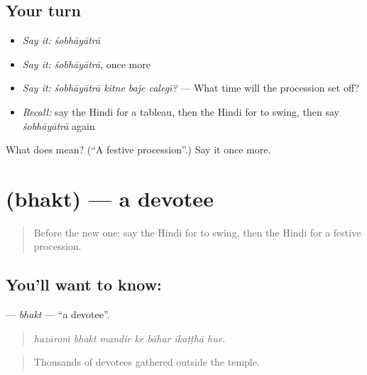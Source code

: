 \subsection*{Your turn}
\begin{itemize}
\raggedright
  \item \emph{Say it:} \emph{śobhāyātrā}
  \item \emph{Say it:} \emph{śobhāyātrā}, once more
  \item \emph{Say it:} \emph{śobhāyātrā kitne baje calegī?} — What time will the procession set off?
  \item \emph{Recall:} say the Hindi for a tableau, then the Hindi for to swing, then say \emph{śobhāyātrā} again
\end{itemize}

\begin{tcolorbox}[breakable,colback=teal!4,colframe=teal!35!black,title={Before you move on}]
What does  mean? (\textquotedblleft{}A festive procession\textquotedblright{}.) Say it once more.
\end{tcolorbox}
\section[\texorpdfstring{\hi{भक्त} (bhakt)}{भक्त (bhakt)}]{ (bhakt) — a devotee}

\label{lesson:HI-C330-bhakt}



\begin{quote}
Before the new one: say the Hindi for to swing, then the Hindi for a festive procession.
\end{quote}

\subsection*{You'll want to know: }
\textbf{} — \emph{bhakt} — \textquotedblleft{}a devotee\textquotedblright{}.

\begin{quote}
      
\end{quote}

\begin{quote}
\emph{hazāroṁ bhakt mandir ke bāhar ikaṭṭhā hue.}
\end{quote}

\begin{quote}
Thousands of devotees gathered outside the temple.
\end{quote}

